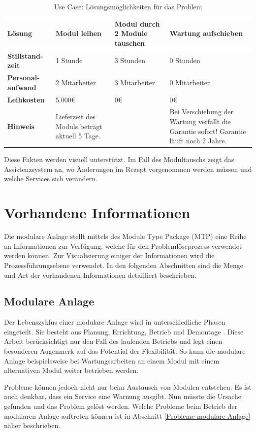 \begin{table}[htbp]
\centering
\caption{Use Case: Lösungsmöglichkeiten für das Problem}
\begin{tabular}{p{}|p{}|p{}|p{}|}
\textbf{Lösung} & Modul leihen & Modul durch 2 Module tauschen & Wartung aufschieben \\
\hline
\textbf{Stillstand-zeit} & 1 Stunde & 3 Stunden & 0 Stunden \\
\hline
\textbf{Personal-aufwand	} & 2 Mitarbeiter & 3 Mitarbeiter & 0 Mitarbeiter \\
\hline
\textbf{Leihkosten} & 5.000€ & 0€ & 0€ \\
\hline
\textbf{Hinweis} & Lieferzeit des Moduls beträgt aktuell 5 Tage. & & Bei Verschiebung der Wartung verfällt die Garantie sofort! Garantie läuft noch 2 Jahre. \\
\hline
\end{tabular}
\label{tab:UseCase-Lösungen}
\end{table}
Diese Fakten werden visuell unterstützt. Im Fall des Modultauschs zeigt das Assistenzsystem an, wo Änderungen im Rezept vorgenommen werden müssen und welche Services sich verändern.

\section{Vorhandene Informationen}
Die modulare Anlage stellt mittels des Module Type Package (MTP) eine Reihe an Informationen zur Verfügung, welche für den Problemlöseprozess verwendet werden können. Zur Visualisierung einiger der Informationen wird die Prozessführungsebene verwendet. In den folgenden Abschnitten sind die Menge und Art der vorhandenen Informationen detailliert beschrieben. 

\subsection{Modulare Anlage}
Der Lebenszyklus einer modulare Anlage wird in unterschiedliche Phasen eingeteilt. Sie besteht aus Planung, Errichtung, Betrieb und Demontage \cite{Obst2013}. Diese Arbeit berücksichtigt nur den Fall des laufenden Betriebs und legt einen besonderen Augenmerk auf das Potential der Flexibilität. So kann die modulare Anlage beispielsweise bei Wartungsarbeiten an einem Modul mit einem alternativen Modul weiter betrieben werden.

Probleme können jedoch nicht nur beim Austausch von Modulen entstehen. Es ist auch denkbar, dass ein Service eine Warnung ausgibt. Nun müsste die Ursache gefunden und das Problem gelöst werden. Welche Probleme beim Betrieb der modularen Anlage auftreten können ist in Abschnitt \ref{Probleme-modulare-Anlage} näher beschrieben.

